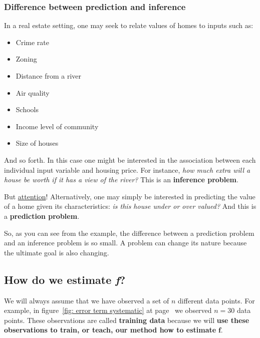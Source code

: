 \documentclass[a4paper]{article}
\newcommand{\definition}[1]{\textcolor{Red3}{\textbf{#1}}\index{#1}}
\begin{document}
    \subsubsection{Difference between prediction and inference}

    \begin{examplebox}
        In a real estate setting, one may seek to relate values of homes to inputs such as:
        \begin{itemize}
            \item Crime rate
            \item Zoning
            \item Distance from a river
            \item Air quality
            \item Schools
            \item Income level of community
            \item Size of houses
        \end{itemize}
        And so forth. In this case one might be interested in the association between each individual input variable and housing price. For instance, \emph{how much extra will a house be worth if it has a view of the river?} This is an \textbf{inference problem}.

        \vspace{.5em}
        But \underline{attention}! Alternatively, one may simply be interested in predicting the value of a home given its characteristics: \emph{is this house under or over valued?} And this is a \textbf{prediction problem}.
    \end{examplebox}

    So, as you can see from the example, the difference between a prediction problem and an inference problem is so small. A problem can change its nature because the ultimate goal is also changing.

    \newpage

    \subsection{How do we estimate \emph{f}?}

    We will always assume that we have observed a set of $n$ different data points. For example, in figure~\ref{fig: error term systematic} at page~\pageref{fig: error term systematic} we observed $n=30$ data points. These observations are called \definition{training data} because we will \textbf{use these observations to train, or teach, our method how to estimate} $\bm{f}$.
    
\end{document}
